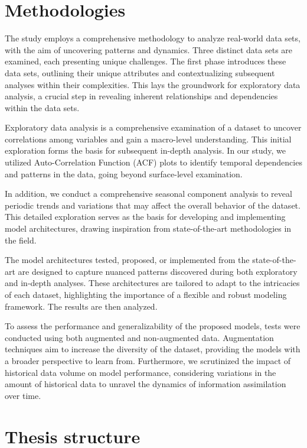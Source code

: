 \section*{Methodologies}

The study employs a comprehensive methodology to analyze real-world data sets, with the aim of uncovering patterns and dynamics. Three distinct data sets are examined, each presenting unique challenges. The first phase introduces these data sets, outlining their unique attributes and contextualizing subsequent analyses within their complexities. This lays the groundwork for exploratory data analysis, a crucial step in revealing inherent relationships and dependencies within the data sets.

Exploratory data analysis is a comprehensive examination of a dataset to uncover correlations among variables and gain a macro-level understanding. This initial exploration forms the basis for subsequent in-depth analysis. In our study, we utilized Auto-Correlation Function (ACF) plots to identify temporal dependencies and patterns in the data, going beyond surface-level examination.

In addition, we conduct a comprehensive seasonal component analysis to reveal periodic trends and variations that may affect the overall behavior of the dataset. This detailed exploration serves as the basis for developing and implementing model architectures, drawing inspiration from state-of-the-art methodologies in the field.

The model architectures tested, proposed, or implemented from the state-of-the-art are designed to capture nuanced patterns discovered during both exploratory and in-depth analyses. These architectures are tailored to adapt to the intricacies of each dataset, highlighting the importance of a flexible and robust modeling framework. The results are then analyzed.

To assess the performance and generalizability of the proposed models, tests were conducted using both augmented and non-augmented data. Augmentation techniques aim to increase the diversity of the dataset, providing the models with a broader perspective to learn from. Furthermore, we scrutinized the impact of historical data volume on model performance, considering variations in the amount of historical data to unravel the dynamics of information assimilation over time.

\section*{Thesis structure}

